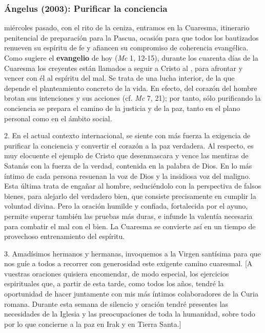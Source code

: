 \subsubsection{Ángelus (2003): Purificar la conciencia}


\begin{body}
 miércoles pasado, con el rito de la ceniza, entramos en la Cuaresma, itinerario penitencial de preparación para la Pascua, ocasión para que todos los bautizados renueven su espíritu de fe y afiancen su compromiso de coherencia evangélica. Como sugiere el \textbf{evangelio} de hoy (\textit{Mc} 1, 12-15), durante los cuarenta días de la Cuaresma los creyentes están llamados a seguir a Cristo al , para afrontar y vencer con él al espíritu del mal. Se trata de una lucha interior, de la que depende el planteamiento concreto de la vida. En efecto, del corazón del hombre brotan sus intenciones y sus acciones (cf. \textit{Mc} 7, 21); por tanto, sólo purificando la conciencia se prepara el camino de la justicia y de la paz, tanto en el plano personal como en el ámbito social.

2. En el actual contexto internacional, se siente con más fuerza la exigencia de purificar la conciencia y convertir el corazón a la paz verdadera. Al respecto, es muy elocuente el ejemplo de Cristo que desenmascara y vence las mentiras de Satanás con la fuerza de la verdad, contenida en la palabra de Dios. En lo más íntimo de cada persona resuenan la voz de Dios y la insidiosa voz del maligno. Esta última trata de engañar al hombre, seduciéndolo con la perspectiva de falsos bienes, para alejarlo del verdadero bien, que consiste precisamente en cumplir la voluntad divina. Pero la oración humilde y confiada, fortalecida por el ayuno, permite superar también las pruebas más duras, e infunde la valentía necesaria para combatir el mal con el bien. La Cuaresma se convierte así en un tiempo de provechoso entrenamiento del espíritu.

3. Amadísimos hermanos y hermanas, invoquemos a la Virgen santísima para que nos guíe a todos a recorrer con generosidad este exigente camino cuaresmal. [A vuestras oraciones quisiera encomendar, de modo especial, los ejercicios espirituales que, a partir de esta tarde, como todos los años, tendré la oportunidad de hacer juntamente con mis más íntimos colaboradores de la Curia romana. Durante esta semana de silencio y oración tendré presentes las necesidades de la Iglesia y las preocupaciones de toda la humanidad, sobre todo por lo que concierne a la paz en Irak y en Tierra Santa.]
\end{body}

